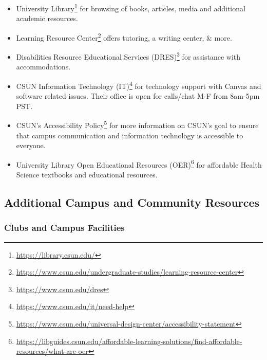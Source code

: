 \documentclass[
  letterpaper,
  DIV=11,
  numbers=noendperiod]{scrartcl}
\DeclareRobustCommand{\href}[2]{#2\footnote{\url{#1}}}
\begin{document}
\begin{itemize}
\item
  University \href{https://library.csun.edu/}{Library} for browsing of
  books, articles, media and additional academic resources.
\item
  \href{https://www.csun.edu/undergraduate-studies/learning-resource-center}{Learning
  Resource Center} offers tutoring, a writing center, \& more.
\item
  \href{https://www.csun.edu/dres}{Disabilities Resource Educational
  Services (DRES)} for assistance with accommodations.
\item
  \href{https://www.csun.edu/it/need-help}{CSUN Information Technology
  (IT)} for technology support with Canvas and software related issues.
  Their office is open for calls/chat M-F from 8am-5pm PST.
\item
  \href{https://www.csun.edu/universal-design-center/accessibility-statement}{CSUN's
  Accessibility Policy} for more information on CSUN's goal to ensure
  that campus communication and information technology is accessible to
  everyone.
\item
  \href{https://libguides.csun.edu/affordable-learning-solutions/find-affordable-resources/what-are-oer}{University
  Library Open Educational Resources (OER)} for affordable Health
  Science textbooks and educational resources.
\end{itemize}

\hypertarget{additional-campus-and-community-resources}{%
\subsection{Additional Campus and Community
Resources}\label{additional-campus-and-community-resources}}

\hypertarget{clubs-and-campus-facilities}{%
\subsubsection{\texorpdfstring{\textbf{Clubs and Campus
Facilities}}{Clubs and Campus Facilities}}\label{clubs-and-campus-facilities}}
\end{document}

